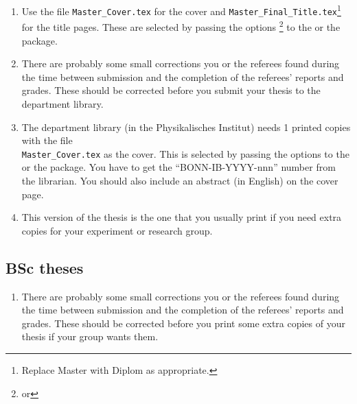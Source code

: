 \begin{enumerate}
\item Use the file \texttt{Master\_Cover.tex} for the cover and
  \texttt{Master\_Final\_Title.tex}\footnote{Replace Master with Diplom
    as appropriate.} for the title pages.
  These are selected by passing the options \footnote{%
    or }
  to the  or the  package.
\item There are probably some small corrections you or the referees
  found during the time between submission and the completion of the
  referees' reports and grades. These should be corrected before you
  submit your thesis to the department library.
\item The department
  library (in the Physikalisches
  Institut) needs 1 printed copies with the file\\
  \texttt{Master\_Cover.tex} as the cover.
  This is selected by passing the options 
  to the  or the  package.
  You have to get
  the \enquote{BONN-IB-YYYY-nnn} number from the librarian. You
  should also include an abstract (in English) on the cover page.
\item This version of the thesis is the one that you usually print if
  you need extra copies for your experiment or research group.
\end{enumerate}


\subsection{BSc theses}

\begin{enumerate}
\item There are probably some small corrections you or the referees
  found during the time between submission and the completion of the
  referees' reports and grades. These should be corrected before you
  print some extra copies of your thesis if your group wants them.
\end{enumerate}

